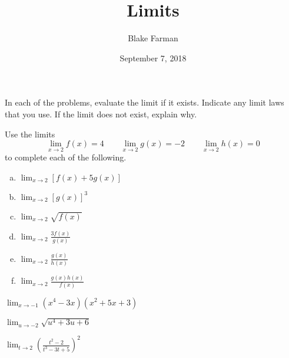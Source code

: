 \documentclass[10pt]{amsart}
\title{Limits}
\date{September 7, 2018}
\author{Blake Farman}
\begin{document}
\maketitle

\makenameslot

In each of the problems, evaluate the limit if it exists.  
Indicate any limit laws that you use.
If the limit does not exist, explain why.
\begin{thm}
  Use the limits
  \[\lim_{x \to 2} f(x) = 4 \qquad \lim_{x\to 2} g(x) = -2\qquad \lim_{x\to2} h(x) = 0\]
  to complete each of the following.

  \begin{enumerate}[(a)]
  \item
    \(\displaystyle{\lim_{x \to 2} [f(x) + 5g(x)]}\)
    \vspace{1in}
  \item
    \(\displaystyle{\lim_{x \to 2} \left[g(x)\right]^3}\)
    \vspace{1in}
  \item
    \(\displaystyle{\lim_{x \to 2} \sqrt{f(x)}}\)
    \newpage
  \item
    \(\displaystyle{\lim_{x \to 2} \frac{3f(x)}{g(x)}}\)
    \vspace{1in}
  \item
    \(\displaystyle{\lim_{x \to 2} \frac{g(x)}{h(x)}}\)
    \vspace{1in}
  \item
    \(\displaystyle{\lim_{x \to 2} \frac{g(x)h(x)}{f(x)}}\)
    \vspace{1in}

  \end{enumerate}
\end{thm}

\begin{thm}
  \(\displaystyle{\lim_{x \to -1}(x^4 - 3x)(x^2 + 5x + 3)}\)
\end{thm}

\vspace{1in}

\begin{thm}
  \(\displaystyle{\lim_{u \to -2} \sqrt{u^4 + 3u + 6}}\)
\end{thm}

\vspace{1in}

\begin{thm}
  \(\displaystyle{\lim_{t \to 2} \left(\frac{t^2 - 2}{t^3 - 3t + 5}\right)^2}\)
\end{thm}
\end{document}
